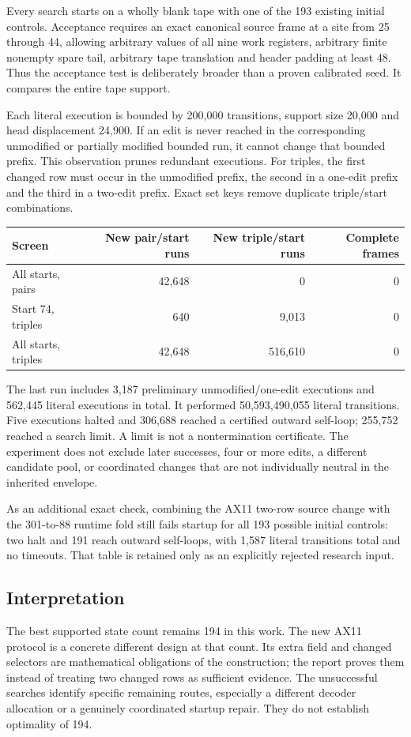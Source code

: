 Every search starts on a wholly blank tape with one of the 193 existing
initial controls. Acceptance requires an exact canonical source frame
at a site from 25 through 44, allowing arbitrary values of all nine work
registers, arbitrary finite nonempty spare tail, arbitrary tape translation
and header padding at least 48. Thus the acceptance test is deliberately
broader than a proven calibrated seed. It compares the entire tape support.

Each literal execution is bounded by 200,000 transitions, support size
20,000 and head displacement 24,900. If an edit is never reached in the
corresponding unmodified or partially modified bounded run, it cannot
change that bounded prefix. This observation prunes redundant executions.
For triples, the first changed row must occur in the unmodified prefix,
the second in a one-edit prefix and the third in a two-edit prefix. Exact
set keys remove duplicate triple/start combinations.

\begin{center}\small
\begin{tabular}{@{}lrrr@{}}\toprule
Screen & New pair/start runs & New triple/start runs & Complete frames\\\midrule
All starts, pairs &42,648&0&0\\
Start 74, triples &640&9,013&0\\
All starts, triples &42,648&516,610&0\\\bottomrule
\end{tabular}
\end{center}
The last run includes 3,187 preliminary unmodified/one-edit executions
and 562,445 literal executions in total. It performed 50,593,490,055
literal transitions. Five executions halted and 306,688 reached a
certified outward self-loop; 255,752 reached a search limit. A limit is
not a nontermination certificate. The experiment does not exclude later
successes, four or more edits, a different candidate pool, or coordinated
changes that are not individually neutral in the inherited envelope.

As an additional exact check, combining the AX11 two-row source change
with the 301-to-88 runtime fold still fails startup for all 193 possible
initial controls: two halt and 191 reach outward self-loops, with 1,587
literal transitions total and no timeouts. That table is retained only as
an explicitly rejected research input.

\subsection{Interpretation}

The best supported state count remains 194 in this work. The new AX11
protocol is a concrete different design at that count. Its extra field
and changed selectors are mathematical obligations of the construction;
the report proves them instead of treating two changed rows as sufficient
evidence. The unsuccessful searches identify specific remaining routes,
especially a different decoder allocation or a genuinely coordinated
startup repair. They do not establish optimality of 194.

